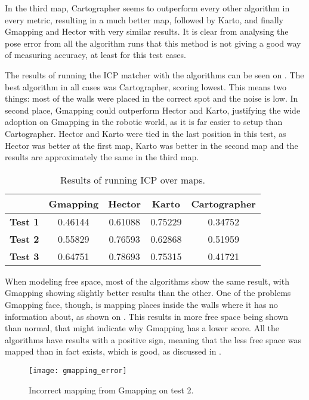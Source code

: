 In the third map, Cartographer seems to outperform every other algorithm in every metric, resulting in a much better map, followed by Karto, and finally Gmapping and Hector with very similar results. It is clear from analysing the pose error from all the algorithm runs that this method is not giving a good way of measuring accuracy, at least for this test cases.

The results of running the ICP matcher with the algorithms can be seen on . The best algorithm in all cases was Cartographer, scoring lowest. This means two things: most of the walls were placed in the correct spot and the noise is low. In second place, Gmapping could outperform Hector and Karto, justifying the wide adoption on Gmapping in the robotic world, as it is far easier to setup than Cartographer. Hector and Karto were tied in the last position in this test, as Hector was better at the first map, Karto was better in the second map and the results are approximately the same in the third map.

\begin{table}[!ht]
\centering
\renewcommand*{\arraystretch}{1.1}
\begin{tabular}{c|c|c|c|c}
& \textbf{Gmapping} & \textbf{Hector} & \textbf{Karto} & \textbf{Cartographer} \\ \hline
\textbf{Test 1} & 0.46144 & 0.61088 & 0.75229 & 0.34752 \\
\textbf{Test 2} & 0.55829 & 0.76593 & 0.62868 & 0.51959 \\
\textbf{Test 3} & 0.64751 & 0.78693 & 0.75315 & 0.41721 \\
 \hline
\end{tabular}
\caption{Results of running ICP over maps.}
\label{tab:results_icp}
\end{table}

When modeling free space, most of the algorithms show the same result, with Gmapping showing slightly better results than the other. One of the problems Gmapping face, though, is mapping places inside the walls where it has no information about, as shown on . This results in more free space being shown than normal, that might indicate why Gmapping has a lower score. All the algorithms have results with a positive sign, meaning that the less free space was mapped than in fact exists, which is good, as discussed in .

\begin{figure}[!ht]
     \centering
     \texttt{[image: gmapping\_error]}
     \caption{Incorrect mapping from Gmapping on test 2.}
     \label{fig:gmapping_error}
\end{figure}

